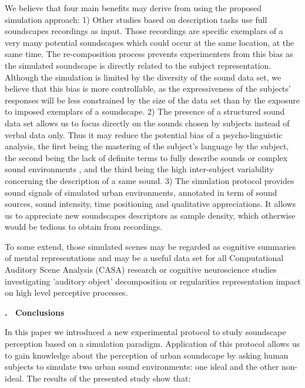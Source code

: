 \documentclass[12pt, titlepage, reqno]{article} %
\renewcommand{\section}[1]{\medskip \addtocounter{section}{1}\raggedright 
     \textbf{\Roman{section}. \ #1}\medskip \setcounter{subsection}{0}
    \setlength{\parindent}{5ex}
 }
\begin{document}
We believe that four main benefits may derive from using the proposed simulation approach: 1) Other studies based on description tasks use full  soundscapes recordings as input. Those recordings are specific exemplars of a very many potential soundscapes which could occur at the same location, at the same time. The re-composition process prevents experimenters from this bias as the simulated soundscape is directly related to the subject representation. Although the simulation is limited by the diversity of the sound data set, we believe that this bias is more controllable, as the expressiveness of the subjects' responses will be less constrained by the size of the data set  than by the exposure to imposed exemplars of a soundscape. 2) The presence of a structured sound data set allows us to focus directly on the sounds chosen by subjects instead of  verbal data only. Thus it may reduce the potential bias of a psycho-linguistic analysis, the first being the mastering of the subject's language by the subject, the second being the lack of definite terms to fully describe sounds or complex sound environments \cite{guastavino_ideal_2006}, and the third being the high inter-subject variability concerning the description of a same sound. 3)  The simulation protocol provides sound signals of simulated urban environments, annotated in term of sound sources, sound intensity, time positioning and qualitative appreciations. It allows us to appreciate new soundscapes descriptors as sample density, which otherwise would be tedious to obtain from recordings.

To some extend, those simulated scenes may be regarded as cognitive summaries of mental representations and may be a useful data set for all Computational Auditory Scene Analysis (CASA) research  or cognitive neuroscience studies investigating 'auditory object' decomposition \cite{nelken2008neurons} or regularities representation impact on high level perceptive processes\cite{winkler2009modeling}.

\section{Conclusions}

In this paper we introduced a new experimental protocol to study soundscape perception based on a simulation paradigm. Application of this protocol allows us to gain knowledge about the perception of urban soundscape by asking human subjects to simulate two urban sound environments: one ideal and the other non-ideal. The results of the presented study show that:
\end{document}
